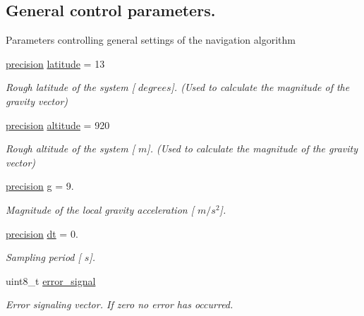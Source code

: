 \subsection*{\-General control parameters.}
\label{_amgrp043d227d7d75d0dd1cb5b6e51032aaac}%
 \-Parameters controlling general settings of the navigation algorithm \begin{DoxyCompactItemize}
\item 
\hyperlink{nav__types_8h_a37e1884b1f06826c49607cec459b4e8a}{precision} \hyperlink{group__nav__eq_ga98eaf96c6c207db4b40273a599149ebe}{latitude} = 13
\begin{DoxyCompactList}\small\item\em \-Rough latitude of the system \mbox{[} $degrees$\mbox{]}. (\-Used to calculate the magnitude of the gravity vector) \end{DoxyCompactList}\item 
\hyperlink{nav__types_8h_a37e1884b1f06826c49607cec459b4e8a}{precision} \hyperlink{group__nav__eq_ga0387cded24d9bdfa34c78dc27bef01e8}{altitude} = 920
\begin{DoxyCompactList}\small\item\em \-Rough altitude of the system \mbox{[} $m$\mbox{]}. (\-Used to calculate the magnitude of the gravity vector) \end{DoxyCompactList}\item 
\hyperlink{nav__types_8h_a37e1884b1f06826c49607cec459b4e8a}{precision} \hyperlink{group__nav__eq_gac7d75e5db7af21a75e50ad6437827947}{g} = 9.
\begin{DoxyCompactList}\small\item\em \-Magnitude of the local gravity acceleration \mbox{[} $m/s^2$\mbox{]}. \end{DoxyCompactList}\item 
\hyperlink{nav__types_8h_a37e1884b1f06826c49607cec459b4e8a}{precision} \hyperlink{group__nav__eq_gae7e97f885bb0d70931c5c70ad200880d}{dt} = 0.
\begin{DoxyCompactList}\small\item\em \-Sampling period \mbox{[} $s$\mbox{]}. \end{DoxyCompactList}\item 
uint8\-\_\-t \hyperlink{group__nav__eq_ga3f996476795917a4b1ace8c6c5e4b28a}{error\-\_\-signal}
\begin{DoxyCompactList}\small\item\em \-Error signaling vector. \-If zero no error has occurred. \end{DoxyCompactList}\end{DoxyCompactItemize}
